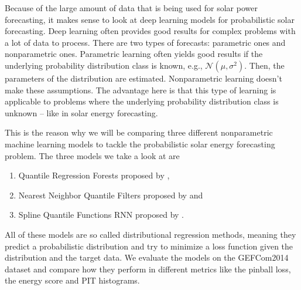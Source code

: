 Because of the large amount of data that is being used for solar power forecasting, it makes sense to look at 
deep learning models for probabilistic solar forecasting. 
Deep learning often provides good results for complex problems with a lot of data to process. 
There are two types of forecasts: parametric ones and nonparametric ones. 
Parametric learning often yields good results if the underlying probability distribution class is known, e.g., \(\mathcal{N}(\mu, \sigma^2)\). 
Then, the parameters of the distribution are estimated. 
Nonparametric learning doesn't make these assumptions. 
The advantage here is that this type of learning is applicable to problems where the underlying 
probability distribution class is unknown -- like in solar energy forecasting. 



This is the reason why we will be comparing three different nonparametric machine learning models to tackle the probabilistic solar energy forecasting problem. 
The three models we take a look at are 
\begin{enumerate}
    \item Quantile Regression Forests proposed by \Textcite{Meinshausen2006},
    \item Nearest Neighbor Quantile Filters proposed by \Textcite{Ordiano2019} and
    \item Spline Quantile Functions RNN proposed by \Textcite{Gasthaus2019}.
\end{enumerate}
All of these models are so called distributional regression methods, meaning 
they predict a probabilistic distribution and try to minimize a loss function 
given the distribution and the target data.
We evaluate the models on the GEFCom2014 dataset and compare how they perform in different metrics like the pinball loss, the energy score and PIT histograms. 